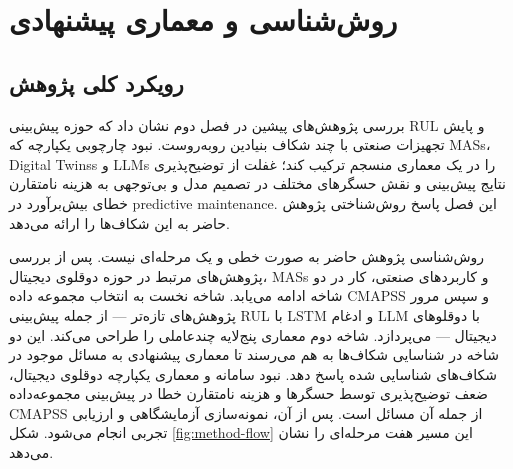 


\chapter{روش‌شناسی و معماری پیشنهادی}\label{chap:methodology}


\section{رویکرد کلی پژوهش}\label{sec:method-approach}

بررسی پژوهش‌های پیشین در فصل دوم نشان داد که حوزه پیش‌بینی \gls{RUL} و پایش تجهیزات صنعتی با چند شکاف بنیادین روبه‌روست. نبود چارچوبی یکپارچه که \glspl{MAS}، \glspl{Digital Twins} و \glspl{LLM} را در یک معماری منسجم ترکیب کند؛ غفلت از توضیح‌پذیری نتایج پیش‌بینی و نقش حسگرهای مختلف در تصمیم مدل و بی‌توجهی به هزینه نامتقارن خطای بیش‌برآورد در \gls{predictive maintenance}. این فصل پاسخ روش‌شناختی پژوهش حاضر به این شکاف‌ها را ارائه می‌دهد.

روش‌شناسی پژوهش حاضر به صورت خطی و یک مرحله‌ای نیست. پس از بررسی پژوهش‌های مرتبط در حوزه دوقلوی دیجیتال، \glspl{MAS} و کاربردهای صنعتی، کار در دو شاخه ادامه می‌یابد. شاخه نخست به انتخاب مجموعه داده \gls{CMAPSS} و سپس مرور پژوهش‌های تازه‌تر --- از جمله پیش‌بینی \gls{RUL} با \gls{LSTM} و ادغام \gls{LLM} با دوقلوهای دیجیتال --- می‌پردازد. شاخه دوم معماری پنج‌لایه چندعاملی را طراحی می‌کند. این دو شاخه در شناسایی شکاف‌ها به هم می‌رسند تا معماری پیشنهادی به مسائل موجود در شکاف‌های شناسایی شده پاسخ دهد. نبود سامانه و معماری یکپارچه دوقلوی دیجیتال، ضعف توضیح‌پذیری توسط حسگر‌ها و هزینه نامتقارن خطا در پیش‌بینی مجموعه‌داده \gls{CMAPSS} از جمله آن مسائل است. پس از آن، نمونه‌سازی آزمایشگاهی و ارزیابی تجربی انجام می‌شود. شکل \ref{fig:method-flow} این مسیر هفت مرحله‌ای را نشان می‌دهد.


